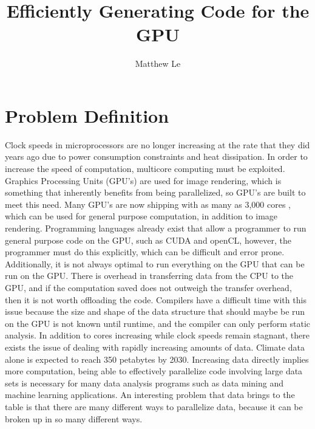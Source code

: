 \documentclass[a4paper,12pt]{article}
\title{Efficiently Generating Code for the GPU}
\author{Matthew Le}
\begin{document}
\maketitle

\section{Problem Definition}
Clock speeds in microprocessors are no longer increasing at the rate that they did years ago due to power consumption constraints and heat dissipation.  In order to increase the speed of computation, multicore computing must be exploited. Graphics Processing Units (GPU's) are used for image rendering, which is something that inherently benefits from being parallelized, so GPU's are built to meet this need.  Many GPU's are now shipping with as many as 3,000 cores \cite{nvideaGPU}, which can be used for general purpose computation, in addition to image rendering.\newline\newline
Programming languages already exist that allow a programmer to run general purpose code on the GPU, such as CUDA and openCL, however, the programmer must do this explicitly, which can be difficult and error prone.  Additionally, it is not always optimal to run everything on the GPU that can be run on the GPU.  There is overhead in transferring data from the CPU to the GPU\cite{dymand}, and if the computation saved does not outweigh the transfer overhead, then it is not worth offloading the code.  Compilers have a difficult time with this issue because the size and shape of the data structure that should maybe be run on the GPU is not known until runtime, and the compiler can only perform static analysis.
\newline\newline
In addition to cores increasing while clock speeds remain stagnant, there exists the issue of dealing with rapidly increasing amounts of data.  Climate data alone is expected to reach 350 petabytes by 2030\cite{climateData}.  Increasing data directly implies more computation, being able to effectively parallelize code involving large data sets is necessary for many data analysis programs such as data mining and machine learning applications.  An interesting problem that data brings to the table is that there are many different ways to parallelize data, because it can be broken up in so many different ways.
\end{document}
